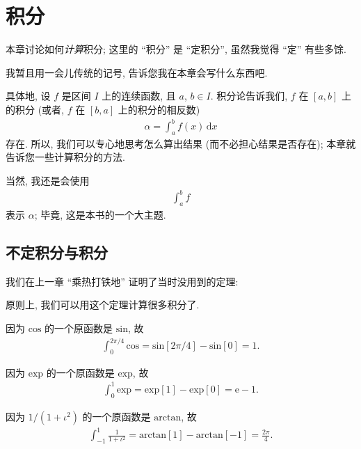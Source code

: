 \chapter{积分}

本章讨论如何\emph{计算}积分;
这里的 ``积分'' 是 ``定积分'',
虽然我觉得 ``定'' 有些多馀.

我暂且用一会儿传统的记号,
告诉您我在本章会写什么东西吧.

具体地, 设 $f$ 是区间 $I$ 上的连续函数, 且 $a$, $b \in I$.
积分论告诉我们, $f$ 在 $[a, b]$ 上的积分
(或者, $f$ 在 $[b, a]$ 上的积分的相反数)
\begin{align*}
    \alpha = \int_{a}^{b} {f(x)\,\mathrm{d}x}
\end{align*}
存在.
所以, 我们可以专心地思考怎么算出结果
(而不必担心结果是否存在);
本章就告诉您一些计算积分的方法.

当然, 我还是会使用
\begin{align*}
    \int_{a}^{b} {f}
\end{align*}
表示 $\alpha$;
毕竟, 这是本书的一个大主题.

\section{不定积分与积分}

我们在上一章 ``乘热打铁地'' 证明了当时没用到的定理:

\NewtonLeibniz*

原则上, 我们可以用这个定理计算很多积分了.

\begin{example}
    因为 $\mathrm{cos}$ 的一个原函数是 $\mathrm{sin}$, 故
    \begin{align*}
        \int_{0}^{2\pi/4} {\mathrm{cos}} = \mathrm{sin} [2\pi/4] - \mathrm{sin} [0] = 1.
    \end{align*}
\end{example}

\begin{example}
    因为 $\mathrm{exp}$ 的一个原函数是 $\mathrm{exp}$, 故
    \begin{align*}
        \int_{0}^{1} {\mathrm{exp}} = \mathrm{exp} [1] - \mathrm{exp} [0] = \mathrm{e} - 1.
    \end{align*}
\end{example}

\begin{example}
    因为 $1/(1 + \iota^2)$ 的一个原函数是 $\mathrm{arctan}$, 故
    \begin{align*}
        \int_{-1}^{1} {\frac{1}{1 + \iota^2}} = \mathrm{arctan} [1] - \mathrm{arctan} [-1] = \frac{2\pi}{4}.
    \end{align*}
\end{example}

